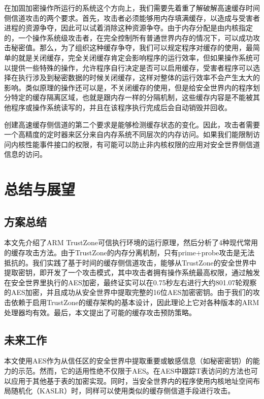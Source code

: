 在加固加密操作所运行的系统这个方向上，我们需要先着重了解破解高速缓存时间侧信道攻击的两个要求。首先，攻击者必须能够用内存填满缓存，以造成与受害者进程的资源争夺，因此可以试着消除这种资源争夺。由于内存分配是由内核指定的，一个操作系统级攻击者，在完全控制所有普通世界内存的情况下，可以成功攻击秘密值。那么，为了组织这种缓存争夺，我们可以规定程序对缓存的使用，最简单的就是关闭缓存，完全关闭缓存肯定会影响程序的运行效率，但如果操作系统可以提供一些特殊的操作，允许程序自行决定是否可以启用缓存，受害者程序可以选择在执行涉及到秘密数据的时候关闭缓存，这样对整体的运行效率不会产生太大的影响。类似原理的操作还可以是，不关闭缓存的使用，但是给安全世界内的程序划分特定的缓存隔离区域，也就是跟内存一样的分隔机制，这些缓存内容是不能被其他程序或操作系统读写的，并且在该程序执行完成后会自动销毁并回收。

创建高速缓存侧信道的第二个要求是能够检测缓存状态的变化。因此，攻击者需要一个高精度的定时器来区分来自内存系统不同层次的内存访问。如果我们能限制访问内核性能事件接口的权限，有可能可以防止非内核权限的应用对安全世界侧信道信息的访问。



\chapter{总结与展望}
\section{方案总结}
本文先介绍了ARM TrustZone可信执行环境的运行原理，然后分析了4种现代常用的缓存攻击方法。由于TrustZone的内存分离机制，只有prime+probe攻击是无法抵抗的。我们实践了基于时间的缓存侧信道攻击，能够从TrustZone的安全世界中提取密钥，即开发了一个攻击模式，其中攻击者拥有操作系统最高权限，通过触发在安全世界里执行的AES加密，最终证实可以在0.75秒左右进行大约801.07轮观察的AES加密，并且成功从安全世界中提取完整的16位AES加密密钥。由于我们的攻击依赖于启用TrustZone的缓存架构的基本设计，因此理论上它对各种版本的ARM处理器均有效。最后，本文提出了可能的缓存攻击预防策略。


\section{未来工作}
本文使用AES作为从信任区的安全世界中提取重要或敏感信息（如秘密密钥）的能力的示范。然而，它的适用性绝不仅限于AES。在AES中跟踪T表访问的方法也可以应用于其他基于表的加密实现\cite{irazoqui2015s,liu2015last}。同时，当安全世界内的程序使用内核地址空间布局随机化（KASLR）\cite{hund2013practical}时，同样可以使用类似的缓存侧信道手段进行攻击。

